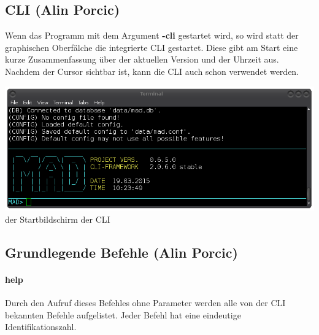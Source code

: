 \documentclass[12pt,a4paper]{report}
\begin{document}
\begin{onehalfspace}
\chapter{CLI (Alin Porcic)}

Wenn das Programm mit dem Argument \textbf{-cli} gestartet wird, so wird statt der graphischen Oberfälche die integrierte CLI gestartet. Diese gibt am Start eine kurze Zusammenfassung über der aktuellen Version und der Uhrzeit aus. Nachdem der Cursor sichtbar ist, kann die CLI auch schon verwendet werden.

\begin{center}
\includegraphics[scale=0.5]{img/cli_mad.png}\\
der Startbildschirm der CLI
\end{center}

\section{Grundlegende Befehle (Alin Porcic)}

\subsubsection{help}

Durch den Aufruf dieses Befehles ohne Parameter werden alle von der CLI bekannten Befehle aufgelistet. Jeder Befehl hat eine eindeutige Identifikationszahl.\\


\end{onehalfspace}
\end{document}
